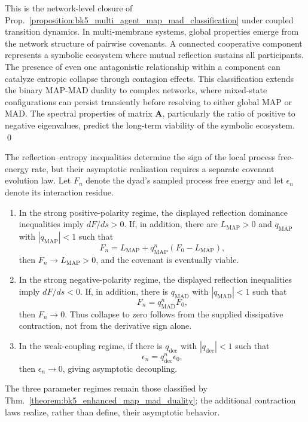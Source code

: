\begin{demonstratio}
\label{demonstratio:bk5_emergent_global_properties}
This is the network-level closure of Prop.~\ref{proposition:bk5_multi_agent_map_mad_classification} under coupled transition dynamics.
In multi-membrane systems, global properties emerge from the network structure of pairwise covenants. A connected cooperative component represents a symbolic ecosystem where mutual reflection sustains all participants. The presence of even one antagonistic relationship within a component can catalyze entropic collapse through contagion effects.
This classification extends the binary MAP-MAD duality to complex networks, where mixed-state configurations can persist transiently before resolving to either global MAP or MAD. The spectral properties of matrix $\mathbf{A}$, particularly the ratio of positive to negative eigenvalues, predict the long-term viability of the symbolic ecosystem. \qed
\end{demonstratio}
\begin{theorem}
\label{theorem:bk5_enhanced_map_mad_duality_pr}
The reflection--entropy inequalities determine the sign of the local process
free-energy rate, but their asymptotic realization requires a separate
covenant evolution law.  Let $F_n$ denote the dyad's sampled process free
energy and let $\epsilon_n$ denote its interaction residue.
\begin{enumerate}
  \item[(i)] In the strong positive-polarity regime, the displayed reflection
  dominance inequalities imply $dF/ds>0$.  If, in addition, there are
  $L_{\mathrm{MAP}}>0$ and $q_{\mathrm{MAP}}$ with
  $|q_{\mathrm{MAP}}|<1$ such that
  \[
    F_n=L_{\mathrm{MAP}}+q_{\mathrm{MAP}}^n(F_0-L_{\mathrm{MAP}}),
  \]
  then $F_n\to L_{\mathrm{MAP}}>0$, and the covenant is eventually viable.
  \item[(ii)] In the strong negative-polarity regime, the displayed
  reflection inequalities imply $dF/ds<0$.  If, in addition, there is
  $q_{\mathrm{MAD}}$ with $|q_{\mathrm{MAD}}|<1$ such that
  \[
    F_n=q_{\mathrm{MAD}}^nF_0,
  \]
  then $F_n\to0$.  Thus collapse to zero follows from the supplied
  dissipative contraction, not from the derivative sign alone.
  \item[(iii)] In the weak-coupling regime, if there is
  $q_{\mathrm{dec}}$ with $|q_{\mathrm{dec}}|<1$ such that
  \[
    \epsilon_n=q_{\mathrm{dec}}^n\epsilon_0,
  \]
  then $\epsilon_n\to0$, giving asymptotic decoupling.
\end{enumerate}
The three parameter regimes remain those classified by
Thm.~\ref{theorem:bk5_enhanced_map_mad_duality}; the additional contraction
laws realize, rather than define, their asymptotic behavior.
\end{theorem}
